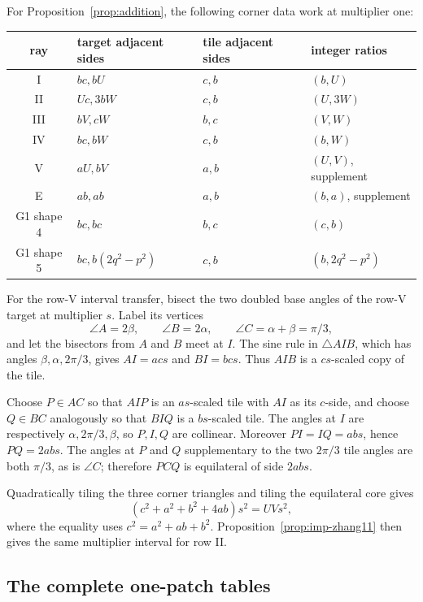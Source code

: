 \documentclass[11pt]{amsart}
\theoremstyle{definition}
\theoremstyle{remark}
\begin{document}
For Proposition~\ref{prop:addition}, the following corner data work at
multiplier one:
\begin{center}
\small
\renewcommand{\arraystretch}{1.12}
\begin{tabular}{@{}clll@{}}
\toprule
ray & target adjacent sides & tile adjacent sides & integer ratios \\
\midrule
I   & $bc,bU$       & $c,b$ & $(b,U)$ \\
II  & $Uc,3bW$      & $c,b$ & $(U,3W)$ \\
III & $bV,cW$       & $b,c$ & $(V,W)$ \\
IV  & $bc,bW$       & $c,b$ & $(b,W)$ \\
V   & $aU,bV$       & $a,b$ & $(U,V)$, supplement \\
E   & $ab,ab$       & $a,b$ & $(b,a)$, supplement \\
G1 shape 4 & $bc,bc$ & $b,c$ & $(c,b)$ \\
G1 shape 5 & $bc,b(2q^2-p^2)$ & $c,b$ &
$(b,2q^2-p^2)$ \\
\bottomrule
\end{tabular}
\end{center}

For the row-V interval transfer, bisect the two doubled base angles of the
row-V target at multiplier $s$.  Label its vertices
\[
       \angle A=2\beta,\qquad \angle B=2\alpha,\qquad
       \angle C=\alpha+\beta=\pi/3,
\]
and let the bisectors from $A$ and $B$ meet at $I$.  The sine rule in
$\triangle AIB$, which has angles $\beta,\alpha,2\pi/3$, gives
$AI=acs$ and $BI=bcs$.  Thus $AIB$ is a $cs$-scaled copy of the tile.

Choose $P\in AC$ so that $AIP$ is an $as$-scaled tile with $AI$ as its
$c$-side, and choose $Q\in BC$ analogously so that $BIQ$ is a $bs$-scaled
tile.  The angles at $I$ are respectively
$\alpha,2\pi/3,\beta$, so $P,I,Q$ are collinear.  Moreover
$PI=IQ=abs$, hence $PQ=2abs$.  The angles at $P$ and $Q$ supplementary to
the two $2\pi/3$ tile angles are both $\pi/3$, as is $\angle C$; therefore
$PCQ$ is equilateral of side $2abs$.

Quadratically tiling the three corner triangles and tiling the equilateral
core gives
\[
 (c^2+a^2+b^2+4ab)s^2=UVs^2,
\]
where the equality uses $c^2=a^2+ab+b^2$.
Proposition~\ref{prop:imp-zhang11} then gives
the same multiplier interval for row II.

\subsection{The complete one-patch tables}
\end{document}
